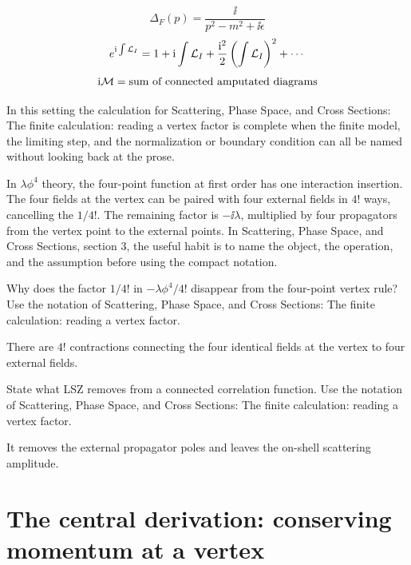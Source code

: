 \[
  \Delta_F(p)=\frac{\ii}{p^2-m^2+\ii\epsilon}
\]
\[
  e^{\mathrm i\int\mathcal L_I}=1+\mathrm i\int\mathcal L_I+\frac{\mathrm i^2}{2}\left(\int\mathcal L_I\right)^2+\cdots
\]
\[
  \mathrm i\mathcal M=\hbox{sum of connected amputated diagrams}
\]

In this setting the calculation for Scattering, Phase Space, and Cross Sections: The finite calculation: reading a vertex factor is complete when the finite model, the limiting step, and the normalization or boundary condition can all be named without looking back at the prose.




\begin{example}
In \(\lambda\phi^4\) theory, the four-point function at first order has one interaction insertion.  The four fields at the vertex can be paired with four external fields in \(4!\) ways, cancelling the \(1/4!\).  The remaining factor is \(-\ii\lambda\), multiplied by four propagators from the vertex point to the external points.  In Scattering, Phase Space, and Cross Sections, section 3, the useful habit is to name the object, the operation, and the assumption before using the compact notation.
\end{example}



\begin{exercise}
Why does the factor \(1/4!\) in \(-\lambda\phi^4/4!\) disappear from the four-point vertex rule?  Use the notation of Scattering, Phase Space, and Cross Sections: The finite calculation: reading a vertex factor.
\begin{answer}
There are \(4!\) contractions connecting the four identical fields at the vertex to four external fields.
\end{answer}
\end{exercise}

\begin{exercise}
State what LSZ removes from a connected correlation function.  Use the notation of Scattering, Phase Space, and Cross Sections: The finite calculation: reading a vertex factor.
\begin{answer}
It removes the external propagator poles and leaves the on-shell scattering amplitude.
\end{answer}
\end{exercise}



\section{The central derivation: conserving momentum at a vertex}

